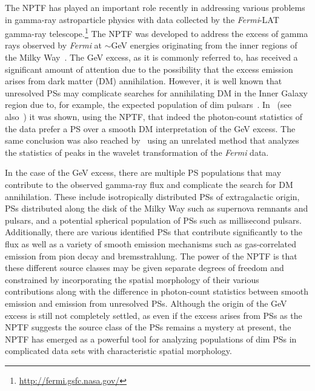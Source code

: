 The NPTF has played an important role recently in addressing various problems in gamma-ray astroparticle physics with data collected by the \emph{Fermi}-LAT gamma-ray telescope.\footnote{\url{http://fermi.gsfc.nasa.gov/}} The NPTF was developed to address the excess of gamma rays observed by \emph{Fermi} at $\sim$GeV energies originating from the inner regions of the Milky Way~\cite{Goodenough:2009gk,Hooper:2010mq,Boyarsky:2010dr,Hooper:2011ti,Abazajian:2012pn,Hooper:2013rwa,Gordon:2013vta,Abazajian:2014fta,Daylan:2014rsa,Calore:2014xka,Abazajian:2014hsa,TheFermi-LAT:2015kwa,Macias:2016nev,Clark:2016mbb}.  The GeV excess, as it is commonly referred to, has received a significant amount of attention due to the possibility that the excess emission arises from dark matter (DM) annihilation.  However, it is well known that unresolved PSs may complicate searches for annihilating DM in the Inner Galaxy region due to, for example, the expected population of dim pulsars~\cite{Abazajian:2014fta,Abazajian:2010zy,Hooper:2013nhl,Calore:2014oga,Cholis:2014lta,Petrovic:2014xra,Yuan:2014yda,OLeary:2015gfa,Brandt:2015ula}.  In~\cite{Lee:2015fea} (see also~\cite{Linden:2016rcf}) it was shown, using the NPTF, that indeed the photon-count statistics of the data prefer a PS over a smooth DM interpretation of the GeV excess.  The same conclusion was also reached by~\cite{Bartels:2015aea} using an unrelated method that analyzes the statistics of peaks in the wavelet transformation of the \emph{Fermi} data.  

In the case of the GeV excess, there are multiple PS populations that may contribute to the observed gamma-ray flux and complicate the search for DM annihilation.  These include isotropically distributed PSs of extragalactic origin, PSs distributed along the disk of the Milky Way such as supernova remnants and pulsars, and a potential spherical population of PSs such as millisecond pulsars.  Additionally, there are various identified PSs that contribute significantly to the flux as well as a variety of smooth emission mechanisms such as gas-correlated emission from pion decay and bremsstrahlung.  The power of the NPTF is that these different source classes may be given separate degrees of freedom and constrained by incorporating the spatial morphology of their various contributions along with the difference in photon-count statistics between smooth emission and emission from unresolved PSs.  Although the origin of the GeV excess is still not completely settled, as even if the excess arises from PSs as the NPTF suggests the source class of the PSs remains a mystery at present, the NPTF has emerged as a powerful tool for analyzing populations of dim PSs in complicated data sets with characteristic spatial morphology.

